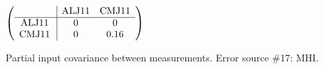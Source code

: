 \begin{table}[H]
\scriptsize
\begin{center}
\renewcommand{\arraystretch}{1.1}
\begin{math}\left(\begin{array}{c|cc}
 & \mathrm{ALJ11} & 
\mathrm{CMJ11} \\
\hline
\mathrm{ALJ11} \hspace*{2pt} &  0 &  0 \\
\mathrm{CMJ11} \hspace*{2pt} &  0 &       0.16 \\
\end{array}\right)\end{math}
\caption{Partial input covariance between measurements. Error source \#17: MHI.}
\renewcommand{\arraystretch}{1}
\end{center}
\end{table}
\clearpage
